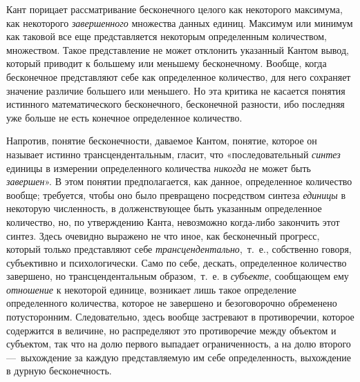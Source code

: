 Кант порицает рассматривание бесконечного целого как некоторого максимума,
как некоторого {\em завершенного} множества данных
единиц. Максимум или минимум как таковой все еще представляется некоторым
определенным количеством, множеством. Такое представление не может
отклонить указанный Кантом вывод, который приводит к большему или меньшему
бесконечному. Вообще, когда бесконечное представляют себе как определенное
количество, для него сохраняет значение различие большего или меньшего. Но
эта критика не касается понятия истинного математического бесконечного,
бесконечной разности, ибо последняя уже больше не есть конечное
определенное количество.

Напротив, понятие бесконечности, даваемое Кантом, понятие, которое он
называет истинно трансцендентальным, гласит, что «последовательный
{\em синтез} единицы в измерении определенного
количества {\em никогда} не может быть
{\em завершен}». В этом понятии предполагается, как
данное, определенное количество вообще; требуется, чтобы оно было
превращено посредством синтеза {\em единицы} в
некоторую численность, в долженствующее быть указанным определенное
количество, но, по утверждению Канта, невозможно когда-либо закончить этот
синтез. Здесь очевидно выражено не что иное, как бесконечный прогресс,
который только представляют себе
{\em трансцендентально},~т.~е., собственно говоря,
субъективно и психологически. Само по себе, дескать, определенное
количество завершено, но трансцендентальным образом,~т.~е. в
{\em субъекте}, сообщающем ему
{\em отношение} к некоторой единице, возникает лишь
такое определение определенного количества, которое не завершено и
безоговорочно обременено потусторонним. Следовательно, здесь вообще
застревают в противоречии, которое содержится в величине, но распределяют
это противоречие между объектом и субъектом, так что на долю первого
выпадает ограниченность, а на долю второго —~выхождение за каждую
представляемую им себе определенность, выхождение в дурную бесконечность.

